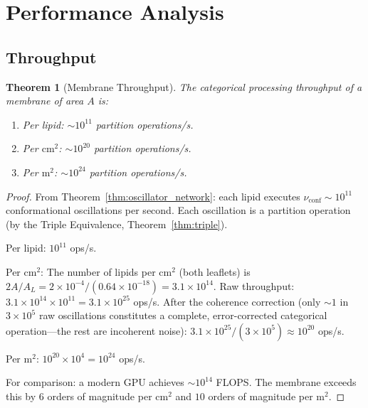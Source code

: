\documentclass[twocolumn,10pt]{article}
\newtheorem{theorem}{Theorem}[section]
\theoremstyle{remark}
\begin{document}
\section{Performance Analysis}
\label{sec:performance}

\subsection{Throughput}

\begin{theorem}[Membrane Throughput]
\label{thm:throughput}
The categorical processing throughput of a membrane of area $A$ is:
\begin{enumerate}
\item Per lipid: $\sim 10^{11}$ partition operations/s.
\item Per $\mathrm{cm}^2$: $\sim 10^{20}$ partition operations/s.
\item Per $\mathrm{m}^2$: $\sim 10^{24}$ partition operations/s.
\end{enumerate}
\end{theorem}

\begin{proof}
From Theorem~\ref{thm:oscillator_network}: each lipid executes $\nu_{\mathrm{conf}} \sim 10^{11}$ conformational oscillations per second. Each oscillation is a partition operation (by the Triple Equivalence, Theorem~\ref{thm:triple}).

Per lipid: $10^{11}$ ops/s.

Per $\mathrm{cm}^2$: The number of lipids per $\mathrm{cm}^2$ (both leaflets) is $2A/A_L = 2 \times 10^{-4} / (0.64 \times 10^{-18}) = 3.1 \times 10^{14}$. Raw throughput: $3.1 \times 10^{14} \times 10^{11} = 3.1 \times 10^{25}$ ops/s. After the coherence correction (only $\sim 1$ in $3 \times 10^5$ raw oscillations constitutes a complete, error-corrected categorical operation---the rest are incoherent noise): $3.1 \times 10^{25} / (3 \times 10^5) \approx 10^{20}$ ops/s.

Per $\mathrm{m}^2$: $10^{20} \times 10^4 = 10^{24}$ ops/s.

For comparison: a modern GPU achieves $\sim 10^{14}$ FLOPS. The membrane exceeds this by $6$ orders of magnitude per $\mathrm{cm}^2$ and $10$ orders of magnitude per $\mathrm{m}^2$.
\end{proof}
\end{document}
